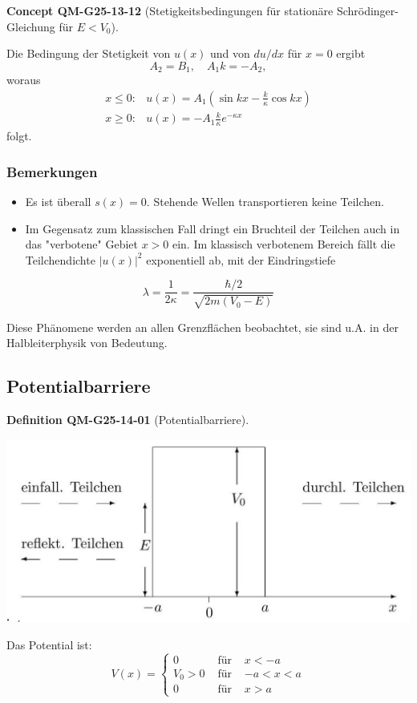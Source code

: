 \documentclass[10pt, letterpaper]{article}
\newcommand{\CustomHeading}[3]{%
  \par\medskip\noindent%
  \textbf{#1 #2} \textnormal{(#3)}.\enskip%
}
\newenvironment{DEF}[2]{\begin{unitbox}\CustomHeading{Definition}{#1}{#2}}{\end{unitbox}}
\newenvironment{CONC}[2]{\begin{unitbox}\CustomHeading{Concept}{#1}{#2}}{\end{unitbox}}
\begin{document}
\begin{CONC}{QM-G25-13-12}{Stetigkeitsbedingungen für stationäre Schrödinger-Gleichung für $E<V_0$}
Die Bedingung der Stetigkeit von $u(x)$ und von $d u / d x$ für $x=0$ ergibt
$$
A_{2}=B_{1}, \quad A_{1} k=-A_{2},
$$
woraus
$$
\begin{array}{ll}
x \leq 0: & u(x)=A_{1}\left(\sin k x-\frac{k}{\kappa} \cos k x\right) \\
x \geq 0: & u(x)=-A_{1} \frac{k}{\kappa} e^{-\kappa x}
\end{array}
$$
folgt.

\subsubsection*{Bemerkungen}
\begin{itemize}
  \item Es ist überall $s(x)=0$. Stehende Wellen transportieren keine Teilchen.
  \item Im Gegensatz zum klassischen Fall dringt ein Bruchteil der Teilchen auch in das "verbotene" Gebiet $x>0$ ein. Im klassisch verbotenem Bereich fällt die Teilchendichte $|u(x)|^{2}$ exponentiell ab, mit der Eindringstiefe
\end{itemize}

$$
\lambda=\frac{1}{2 \kappa}=\frac{\hbar / 2}{\sqrt{2 m\left(V_{0}-E\right)}}
$$
\end{CONC}

Diese Phänomene werden an allen Grenzflächen beobachtet, sie sind u.A. in der Halbleiterphysik von Bedeutung.





\pagebreak


\subsection{Potentialbarriere}




\begin{DEF}{QM-G25-14-01}{Potentialbarriere}
\begin{center}
\includegraphics[scale=0.2]{2025_05_21_2790b5a0182e53887e3bg-08}
\end{center}

Das Potential ist:
$$
V(x)=\left\{\begin{array}{llc}
0 & \text { für } & x<-a \\
V_{0}>0 & \text { für } & -a<x<a \\
0 & \text { für } & x>a
\end{array}\right.
$$
\end{DEF}
\end{document}
